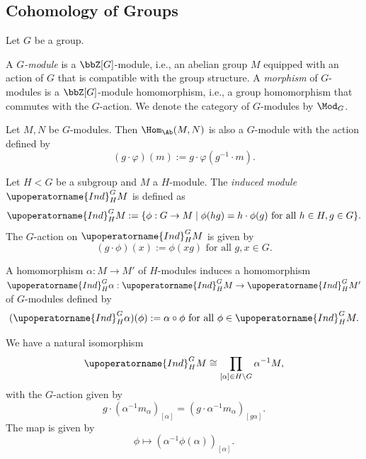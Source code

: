 \subsection{Cohomology of Groups}

  Let $G$ be a group.

  \begin{definition}
    A \emph{$G$-module} is a $\bbZ[G]$-module, i.e., an abelian group $M$ equipped with an action of $G$ that is compatible with the group structure.
    A \emph{morphism} of $G$-modules is a $\bbZ[G]$-module homomorphism, i.e., a group homomorphism that commutes with the $G$-action.
    We denote the category of $G$-modules by $\Mod_G$.
  \end{definition}

  Let $M,N$ be $G$-modules.
  Then $\Hom_{\Ab}(M,N)$ is also a $G$-module with the action defined by 
  \[ (g \cdot \varphi)(m) := g \cdot \varphi(g^{-1} \cdot m). \]

  \begin{definition}
    Let $H < G$ be a subgroup and $M$ a $H$-module.
    The \emph{induced module} $\upoperatorname{Ind}_H^G M$ is defined as
    \[ \upoperatorname{Ind}_H^G M := \{\phi: G \to M \mid \phi(hg) = h \cdot \phi(g) \text{ for all } h \in H, g \in G\}. \]
    The $G$-action on $\upoperatorname{Ind}_H^G M$ is given by 
    \[ (g \cdot \phi)(x) := \phi(xg) \text{ for all } g,x \in G. \]
    
    A homomorphism $\alpha: M \to M'$ of $H$-modules induces a homomorphism $\upoperatorname{Ind}_H^G \alpha: \upoperatorname{Ind}_H^G M \to \upoperatorname{Ind}_H^G M'$ of $G$-modules defined by 
    \[ (\upoperatorname{Ind}_H^G \alpha)(\phi) := \alpha \circ \phi \text{ for all } \phi \in \upoperatorname{Ind}_H^G M. \]
  \end{definition}

  \begin{remark}
    We have a natural isomorphism 
    \[ \upoperatorname{Ind}_H^G M \cong \prod_{[\alpha] \in H \backslash G} \alpha^{-1} M, \]
    with the $G$-action given by 
    \[ g \cdot (\alpha^{-1} m_\alpha)_{[\alpha]} = (g \cdot \alpha^{-1} m_\alpha)_{[g\alpha]}. \]
    The map is given by 
    \[ \phi \mapsto (\alpha^{-1} \phi(\alpha))_{[\alpha]}. \]
  \end{remark}

